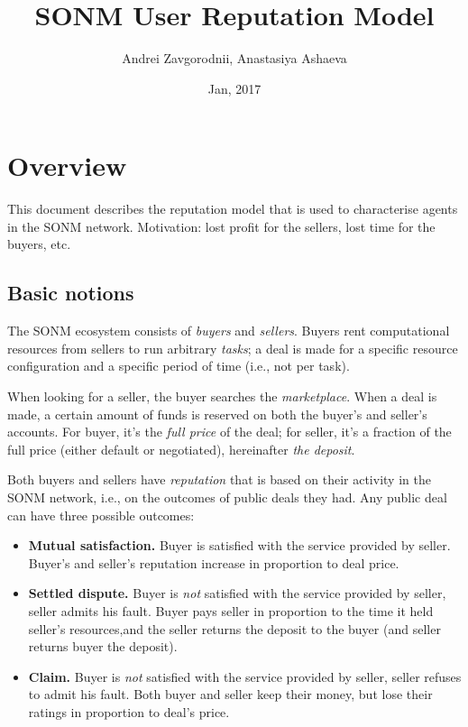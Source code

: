 \documentclass[11pt]{article}
\title{SONM User Reputation Model}
\author{Andrei Zavgorodnii, Anastasiya Ashaeva}
\date{Jan, 2017}
\begin{document}
\maketitle
\tableofcontents
 
\section{Overview} \label{overview}

This document describes the reputation model that is used to characterise agents in the SONM network. Motivation: lost profit for the sellers, lost time for the buyers, etc.

\subsection{Basic notions} \label{basicNotions}

The SONM ecosystem consists of \textit{buyers} and \textit{sellers}. Buyers rent computational resources from sellers to run arbitrary \textit{tasks}; a deal is made for a specific resource configuration and a specific period of time (i.e., not per task).

When looking for a seller, the buyer searches the \textit{marketplace}. When a deal is made, a certain amount of funds is reserved on both the buyer's and seller's accounts. For buyer, it's the \textit{full price} of the deal; for seller, it's a fraction of the full price (either default or negotiated), hereinafter \textit{the deposit}.

Both buyers and sellers have \textit{reputation} that is based on their activity in the SONM network, i.e., on the outcomes of public deals they had. Any public deal can have three possible outcomes:

\begin{itemize}
\item \textbf{Mutual satisfaction.} Buyer is satisfied with the service provided by seller. Buyer's and seller's reputation increase in proportion to deal price.
\item \textbf{Settled dispute.} Buyer is \textit{not} satisfied with the service provided by seller, seller admits his fault. Buyer pays seller in proportion to the time it held seller's resources,and the seller returns the deposit to the buyer (and seller returns buyer the deposit).
\item \textbf{Claim.} Buyer is \textit{not} satisfied with the service provided by seller, seller refuses to admit his fault. Both buyer and seller keep their money, but lose their ratings in proportion to deal's price.
\end{itemize}
\end{document}
